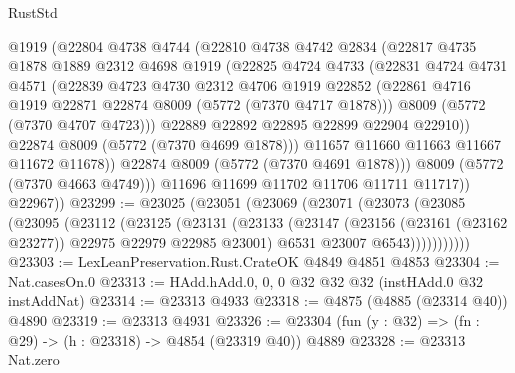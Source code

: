 \begin{lexlean}{RustStd}
\begin{coremodule}
{\begin{coremodule}
{{{{{{{{{{{{{{{{{{{{{{{{{{{{{                @1919
                (@22804
                  @4738
                  @4744
                  (@22810
                    @4738
                    @4742
                    @2834
                    (@22817
                      @4735
                      @1878
                      @1889
                      @2312
                      @4698
                      @1919
                      (@22825
                        @4724
                        @4733
                        (@22831
                          @4724
                          @4731
                          @4571
                          (@22839
                            @4723
                            @4730
                            @2312
                            @4706
                            @1919
                            @22852
                            (@22861 @4716 @1919 @22871 @22874 @8009 (@5772 (@7370 @4717 @1878)))
                            @8009
                            (@5772 (@7370 @4707 @4723)))
                          @22889
                          @22892
                          @22895
                          @22899
                          @22904
                          @22910))
                      @22874
                      @8009
                      (@5772 (@7370 @4699 @1878)))
                    @11657
                    @11660
                    @11663
                    @11667
                    @11672
                    @11678))
                @22874
                @8009
                (@5772 (@7370 @4691 @1878)))
              @8009
              (@5772 (@7370 @4663 @4749)))
            @11696
            @11699
            @11702
            @11706
            @11711
            @11717))
        @22967))
@23299 := @23025
    (@23051
      (@23069
        (@23071
          (@23073
            (@23085
              (@23095
                (@23112
                  (@23125
                    (@23131
                      (@23133
                        (@23147
                          (@23156 (@23161 (@23162 @23277)) @22975 @22979 @22985 @23001)
                          @6531
                          @23007
                          @6543)))))))))))
@23303 := LexLeanPreservation.Rust.CrateOK @4849 @4851 @4853
@23304 := Nat.casesOn.{0}
@23313 := HAdd.hAdd.{0, 0, 0} @32 @32 @32 (instHAdd.{0} @32 instAddNat)
@23314 := @23313 @4933
@23318 := @4875 (@4885 (@23314 @40)) @4890
@23319 := @23313 @4931
@23326 := @23304 (fun (y : @32) => (fn : @29) -> (h : @23318) -> @4854 (@23319 @40)) @4889
@23328 := @23313 Nat.zero
}}}}}}}}}}}}}}}}}}}}}}}}}}}}}
\end{coremodule}}
\end{coremodule}
\end{lexlean}
